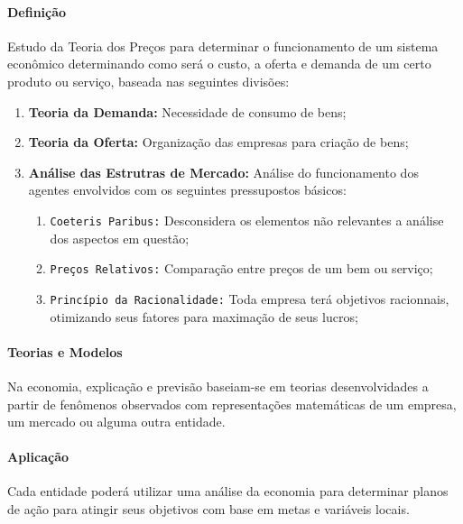 \documentclass{article}
\begin{document}
        \paragraph{Definição}Estudo da Teoria dos Preços para determinar o funcionamento de um sistema econômico determinando como será o custo, a oferta e demanda de um certo produto ou serviço, baseada nas seguintes divisões:
            \begin{enumerate}[noitemsep, rightmargin = \leftmargin]
                \item \textbf{Teoria da Demanda:} Necessidade de consumo de bens;

                \item \textbf{Teoria da Oferta:} Organização das empresas para criação de bens;

                \item \textbf{Análise das Estrutras de Mercado:} Análise do funcionamento dos agentes envolvidos com os seguintes pressupostos básicos:
                    \begin{enumerate}[noitemsep, rightmargin = \leftmargin]
                        \item \texttt{Coeteris Paribus:} Desconsidera os elementos não relevantes a análise dos aspectos em questão; 
                        \item \texttt{Preços Relativos:} Comparação entre preços de um bem ou serviço;
                        \item \texttt{Princípio da Racionalidade:} Toda empresa terá objetivos racionnais, otimizando seus fatores para maximação de seus lucros;
                    \end{enumerate}
            \end{enumerate}

        \paragraph{Teorias e Modelos}Na economia, explicação e previsão baseiam-se em teorias desenvolvidades a partir de fenômenos observados com representações matemáticas de um empresa, um mercado ou alguma outra entidade.

        \paragraph{Aplicação}Cada entidade poderá utilizar uma análise da economia para determinar planos de ação para atingir seus objetivos com base em metas e variáveis locais.
\end{document}
